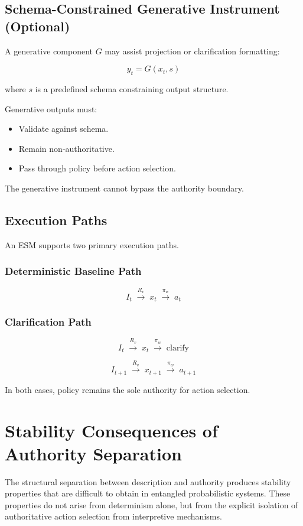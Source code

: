\documentclass[11pt]{article}
\begin{document}
\subsection{Schema-Constrained Generative Instrument (Optional)}

A generative component $G$ may assist projection or clarification formatting:

\[
y_t = G(x_t, s)
\]

where $s$ is a predefined schema constraining output structure.

Generative outputs must:

\begin{itemize}
  \item Validate against schema.
  \item Remain non-authoritative.
  \item Pass through policy before action selection.
\end{itemize}

The generative instrument cannot bypass the authority boundary.

\subsection{Execution Paths}

An ESM supports two primary execution paths.

\subsubsection*{Deterministic Baseline Path}

\[
I_t 
\;\xrightarrow{R_v}\;
x_t
\;\xrightarrow{\pi_w}\;
a_t
\]

\subsubsection*{Clarification Path}

\[
I_t
\;\xrightarrow{R_v}\;
x_t
\;\xrightarrow{\pi_w}\;
\text{clarify}
\]

\[
I_{t+1}
\;\xrightarrow{R_v}\;
x_{t+1}
\;\xrightarrow{\pi_w}\;
a_{t+1}
\]

In both cases, policy remains the sole authority for action selection.


\section{Stability Consequences of Authority Separation}
The structural separation between description and authority produces stability properties that are difficult to obtain in entangled probabilistic systems. These properties do not arise from determinism alone, but from the explicit isolation of authoritative action selection from interpretive mechanisms.
\end{document}
